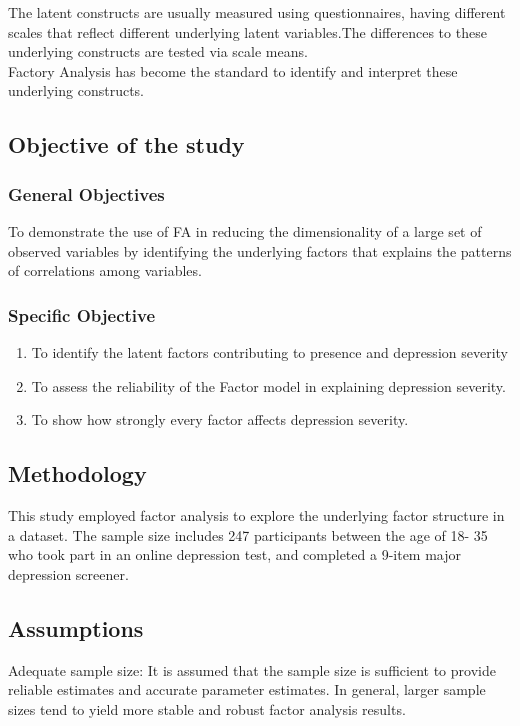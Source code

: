 \documentclass[12pt]{article}
\begin{document}
\noindent The latent constructs are usually measured using questionnaires, having different scales that reflect different underlying latent variables.The differences to these underlying constructs are tested via scale means.\\

\noindent Factory Analysis has become the standard to identify and interpret these underlying constructs.


\subsection{Objective of the study}
\subsubsection*{General Objectives}
To demonstrate the use of FA in reducing the dimensionality of a large set of observed variables by identifying the underlying factors that explains the patterns of correlations among variables.

\subsubsection*{Specific Objective}
\begin{enumerate}
\item To identify the latent factors contributing to presence and depression severity
\item To assess the reliability of the Factor model in explaining depression severity.
\item To show how strongly every factor affects depression severity.
\end{enumerate}

\subsection{Methodology}
This study employed factor analysis to explore the underlying factor structure in a dataset. The sample size includes 247 participants between the age of 18- 35 who took part in an online depression test, and completed a 9-item major depression screener.

\subsection{Assumptions}
\noindent Adequate sample size: It is assumed that the sample size is sufficient to provide reliable estimates and accurate parameter estimates. In general, larger sample sizes tend to yield more stable and robust factor analysis results.\\
\end{document}
